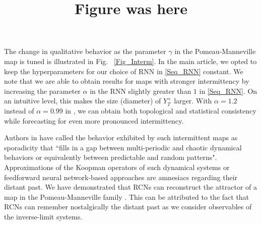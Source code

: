 \documentclass[12 pt]{article}
\begin{document}
The change in qualitative behavior as the parameter $\gamma$ in the Pomeau-Manneville map is tuned is illustrated in Fig.~ \ref{Fig_Interm}. In the main article, we opted to keep the hyperparameters for our choice of RNN in \eqref{Seq_RNN} constant.  We note that we are able to obtain results for maps with stronger intermittency by increasing the parameter $\alpha$ in the RNN slightly greater than $1$ in \eqref{Seq_RNN}. On an intuitive level, this makes the size (diameter) of $Y_T^+$ larger.   With $\alpha=1.2$ instead of $\alpha=0.99$ in \cite{Main_article}, we can obtain both topological and statistical consistency while forecasting for even more pronounced intermittency. 

Authors in \cite{gaspard1988sporadicity} have called the behavior exhibited by such intermittent maps as sporadicity that ``fills in a gap between multi-periodic and chaotic dynamical behaviors or equivalently between predictable and random patterns".  Approximations of the Koopman operators of such dynamical systems or feedforward neural network-based approaches are amnesiacs regarding their distant past. We have demonstrated that RCNs can reconstruct the attractor of a map in the Pomeau-Manneville family \cite[Fig. ~\ref{Fig_2}D]{Main_article}. This can be attributed to the fact that RCNs can remember nostalgically the distant past as we consider observables of the inverse-limit systems. 



\title{Figure was here}
\end{document}
